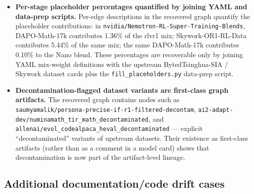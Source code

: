 \begin{itemize}
    \item \textbf{Per-stage placeholder percentages quantified by joining YAML and data-prep scripts.}
    Per-edge descriptions in the recovered graph quantify the placeholder contributions: in \texttt{nvidia/Nemotron-RL-Super-Training-Blends}, DAPO-Math-17k contributes 1.36\% of the rlvr1 mix; Skywork-OR1-RL-Data contributes 5.44\% of the same mix; the same DAPO-Math-17k contributes 0.10\% to the Nano blend. These percentages are recoverable only by joining YAML mix-weight definitions with the upstream BytedTsinghua-SIA / Skywork dataset cards plus the \texttt{fill\_placeholders.py} data-prep script.

    \item \textbf{Decontamination-flagged dataset variants are first-class graph artifacts.}
    The recovered graph contains nodes such as \texttt{saumyamalik/persona-precise-if-r1-filtered-decontam}, \texttt{ai2-adapt-dev/numinamath\_tir\_math\_decontaminated}, and \texttt{allenai/evol\_codealpaca\_heval\_decontaminated} --- explicit ``decontaminated'' variants of upstream datasets. Their existence as first-class artifacts (rather than as a comment in a model card) shows that decontamination is now part of the artifact-level lineage.
\end{itemize}

\subsection{Additional documentation/code drift cases}

